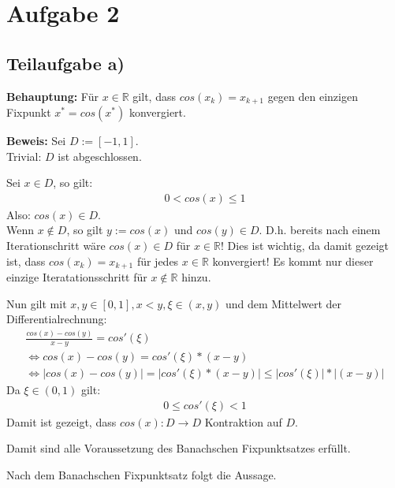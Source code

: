 \section*{Aufgabe 2}
\subsection*{Teilaufgabe a)}

\textbf{Behauptung:} Für $x \in \mathbb{R}$ gilt, dass $cos(x_k) = x_{k+1}$ gegen den einzigen Fixpunkt $x^{*} = cos(x^{*})$ konvergiert.

\textbf{Beweis:} 
Sei $ D := [-1, 1]$.\\
Trivial: $D$ ist abgeschlossen.

Sei $ x \in D$, so gilt:
\begin{align*}
	0 < cos(x) \leq 1
\end{align*}
Also: $cos(x) \in D$.\\ Wenn $x \not\in D$, so gilt $y := cos(x)$ und $cos(y) \in D$. D.h. bereits nach einem Iterationschritt wäre $cos(x) \in D$ für $x \in \mathbb{R}$! Dies ist wichtig, da damit gezeigt ist, dass $cos(x_k) = x_{k+1}$ für jedes $x \in \mathbb{R}$ konvergiert! Es kommt nur dieser einzige Iteratationsschritt für $x \not\in \mathbb{R}$ hinzu.

Nun gilt mit $ x, y \in [0,1], x < y, \xi \in (x,y) $ und dem Mittelwert der Differentialrechnung:
\begin{align*}
	\frac{cos(x) - cos(y)}{x - y} = cos'(\xi) \\
	\Leftrightarrow cos(x) - cos(y) =  cos'(\xi) * (x - y)  \\
	\Leftrightarrow | cos(x) - cos(y) | = | cos'(\xi) * (x - y) | \leq | cos'(\xi) | * | (x - y) | 
\end{align*}
Da $ \xi \in (0, 1) $ gilt:
\begin{align*}
	0 \leq cos'(\xi) < 1 
\end{align*}
Damit ist gezeigt, dass $cos(x) : D \rightarrow D$ Kontraktion auf $D$.

Damit sind alle Voraussetzung des Banachschen Fixpunktsatzes erfüllt.

Nach dem Banachschen Fixpunktsatz folgt die Aussage.